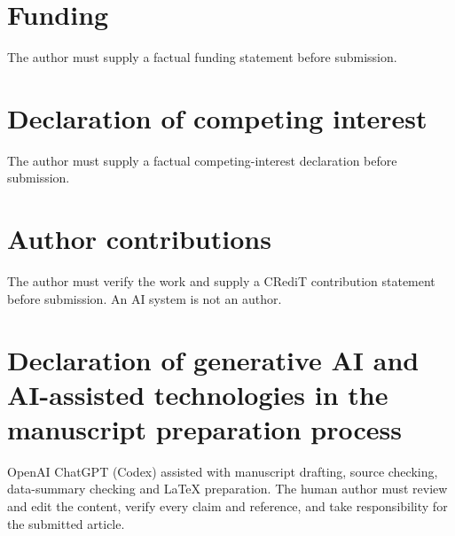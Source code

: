 \documentclass[preprint,12pt]{elsarticle}
\begin{document}
\section*{Funding}
The author must supply a factual funding statement before submission.

\section*{Declaration of competing interest}
The author must supply a factual competing-interest declaration before submission.

\section*{Author contributions}
The author must verify the work and supply a CRediT contribution statement before submission. An AI system is not an author.

\section*{Declaration of generative AI and AI-assisted technologies in the manuscript preparation process}
OpenAI ChatGPT (Codex) assisted with manuscript drafting, source checking, data-summary checking and LaTeX preparation. The human author must review and edit the content, verify every claim and reference, and take responsibility for the submitted article.

\begingroup
\raggedright


\endgroup
\end{document}
